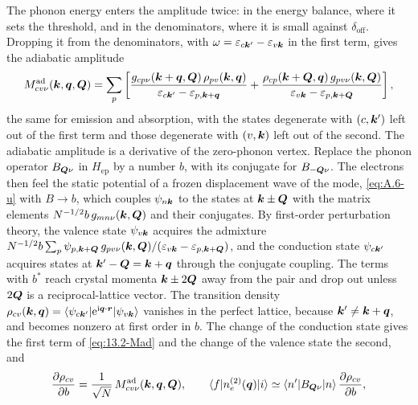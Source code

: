 The phonon energy enters the amplitude twice: in the energy balance, where it sets the threshold, and in the denominators, where it is small against $\delta_{\mathrm{off}}$. Dropping it from the denominators, with $\omega = \varepsilon_{c\bm{k}'} - \varepsilon_{v\bm{k}}$ in the first term, gives the adiabatic amplitude
\begin{equation}
  M^{\mathrm{ad}}_{cv\nu}(\bm{k},\bm{q},\bm{Q}) = \sum_p\left[\frac{g_{cp\nu}(\bm{k}+\bm{q},\bm{Q})\,\rho_{pv}(\bm{k},\bm{q})}{\varepsilon_{c\bm{k}'} - \varepsilon_{p,\bm{k}+\bm{q}}} + \frac{\rho_{cp}(\bm{k}+\bm{Q},\bm{q})\,g_{pv\nu}(\bm{k},\bm{Q})}{\varepsilon_{v\bm{k}} - \varepsilon_{p,\bm{k}+\bm{Q}}}\right] ,
  \label{eq:13.2-Mad}
\end{equation}
the same for emission and absorption, with the states degenerate with $(c,\bm{k}')$ left out of the first term and those degenerate with $(v,\bm{k})$ left out of the second. The adiabatic amplitude is a derivative of the zero-phonon vertex. Replace the phonon operator $B_{\bm{Q}\nu}$ in $H_{\mathrm{ep}}$ by a number $b$, with its conjugate for $B_{-\bm{Q}\nu}$. The electrons then feel the static potential of a frozen displacement wave of the mode, \cref{eq:A.6-u} with $B \to b$, which couples $\psi_{n\bm{k}}$ to the states at $\bm{k}\pm\bm{Q}$ with the matrix elements $N^{-1/2}b\,g_{mn\nu}(\bm{k},\bm{Q})$ and their conjugates. By first-order perturbation theory, the valence state $\psi_{v\bm{k}}$ acquires the admixture $N^{-1/2}b\sum_p\psi_{p,\bm{k}+\bm{Q}}\,g_{pv\nu}(\bm{k},\bm{Q})/(\varepsilon_{v\bm{k}} - \varepsilon_{p,\bm{k}+\bm{Q}})$, and the conduction state $\psi_{c\bm{k}'}$ acquires states at $\bm{k}'-\bm{Q} = \bm{k}+\bm{q}$ through the conjugate coupling. The terms with $b^*$ reach crystal momenta $\bm{k}\pm2\bm{Q}$ away from the pair and drop out unless $2\bm{Q}$ is a reciprocal-lattice vector. The transition density $\rho_{cv}(\bm{k},\bm{q}) = \langle\psi_{c\bm{k}'}|\mathrm{e}^{\mathrm{i}\bm{q}\cdot\bm{r}}|\psi_{v\bm{k}}\rangle$ vanishes in the perfect lattice, because $\bm{k}' \ne \bm{k}+\bm{q}$, and becomes nonzero at first order in $b$. The change of the conduction state gives the first term of \cref{eq:13.2-Mad} and the change of the valence state the second, and
\begin{equation}
  \frac{\partial\rho_{cv}}{\partial b} = \frac{1}{\sqrt N}\,M^{\mathrm{ad}}_{cv\nu}(\bm{k},\bm{q},\bm{Q}) , \qquad
  \langle f|n_e^{(2)}(\bm{q})|i\rangle \simeq \langle n'|B_{\bm{Q}\nu}|n\rangle\,\frac{\partial\rho_{cv}}{\partial b} ,
  \label{eq:13.2-HT}
\end{equation}
